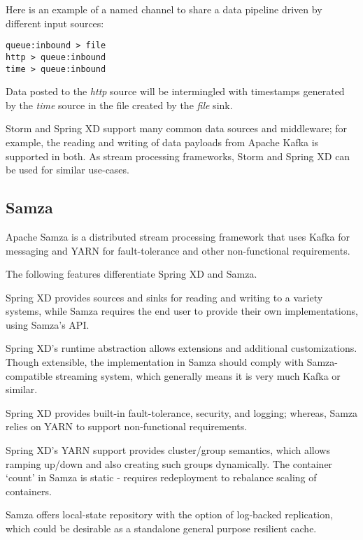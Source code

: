 Here is an example of a named channel to share a data pipeline driven
by different input sources:

\begin{lstlisting}
queue:inbound > file
http > queue:inbound
time > queue:inbound
\end{lstlisting}

Data posted to the \emph{http} source will be intermingled with timestamps
generated by the \emph{time} source in the file created by the \emph{file}
sink.

Storm and Spring XD support many common data sources and middleware;
for example, the reading and writing of data payloads from Apache Kafka
is supported in both. As stream processing frameworks, Storm and Spring
XD can be used for similar use-cases.

\subsection{Samza}
Apache Samza\cite{samza} is a distributed stream processing framework that uses
Kafka for messaging and YARN for fault-tolerance and other non-functional
requirements.

The following features differentiate Spring XD and Samza.

\begin{itemize*}
\item Spring XD provides sources and sinks for reading and writing to a
variety systems, while Samza requires the end user to provide their
own implementations, using Samza's API.
\item Spring XD's runtime abstraction allows extensions and additional
customizations. Though extensible, the implementation in Samza should comply with
Samza-compatible streaming system, which generally means it is very much Kafka
or similar.
\item Spring XD provides built-in fault-tolerance, security, and logging; whereas,
Samza relies on YARN to support non-functional requirements.
\item Spring XD's YARN support provides cluster/group semantics, which allows
ramping up/down and also creating such groups dynamically. The container `count'
in Samza is static - requires redeployment to rebalance scaling of containers.
\end{itemize*}

Samza offers local-state repository with the option of log-backed replication,
which could be desirable as a standalone general purpose resilient cache.

